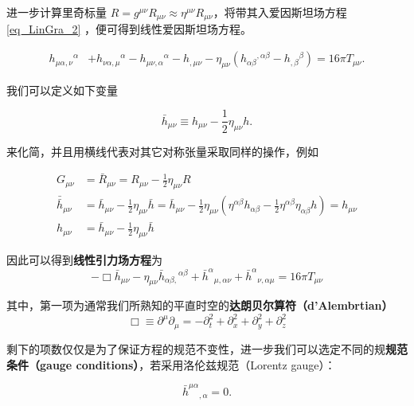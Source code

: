 进一步计算里奇标量 $R = g^{\mu\nu}R_{\mu\nu}\approx \eta^{\mu\nu}R_{\mu\nu}$，将带其入爱因斯坦场方程\autoref{eq_LinGra_2}  ，便可得到线性爱因斯坦场方程。

\begin{equation}
\begin{aligned}
h_{\mu \alpha, \nu}{ }^{\alpha} &+h_{\nu \alpha, \mu}{ }^{\alpha}-h_{\mu \nu, \alpha}{ }^{\alpha}-h_{, \mu \nu} -\eta_{\mu \nu}\left(h_{\alpha \beta}{ }^{, \alpha \beta}-h_{, \beta}{ }^{\beta}\right)= 16 \pi T_{\mu \nu} .
\end{aligned}
\end{equation}

我们可以定义如下变量

\begin{equation}
\bar{h}_{\mu\nu} \equiv h_{\mu\nu} - \frac{1}{2}\eta_{\mu\nu}h.
\end{equation}

来化简，并且用横线代表对其它对称张量采取同样的操作，例如

\begin{align}
G_{\mu\nu} &= \bar{R}_{\mu\nu} = R_{\mu\nu}- \frac{1}{2}\eta_{\mu\nu}R\\
\bar{\bar{h}}_{\mu\nu} &= \bar{h}_{\mu\nu} - \frac{1}{2}\eta_{\mu\nu}\bar{h} = \bar{h}_{\mu\nu} - \frac{1}{2}\eta_{\mu\nu} (\eta^{\alpha\beta}h_{\alpha\beta}-\frac{1}{2}\eta^{\alpha\beta}\eta_{\alpha\beta}h)= h_{\mu\nu}\\
h_{\mu\nu} &= \bar{h}_{\mu\nu} - \frac{1}{2}\eta_{\mu\nu} \bar{h}
\end{align}

因此可以得到\textbf{线性引力场方程}为
\begin{equation}
-\Box{\bar{h}_{\mu \nu}}-\eta_{\mu \nu} \bar{h}_{\alpha \beta,}{ }^{\alpha \beta} + \bar{h}^{\alpha}{ }_{\mu,\alpha\nu} + \bar{h}^{\alpha}{ }_{\nu,\alpha\mu}=16 \pi T_{\mu \nu}
\end{equation}

其中，第一项为通常我们所熟知的平直时空的\textbf{达朗贝尔算符（d'Alembrtian）}
$$
\Box \equiv  \partial^\mu\partial_\mu =  - \partial_t^2 + \partial_x^2 +\partial_y^2 + \partial_z^2
$$

剩下的项数仅仅是为了保证方程的规范不变性，进一步我们可以选定不同的规\textbf{规范条件（gauge conditions）}，若采用洛伦兹规范（Lorentz gauge）：

\begin{equation}
\bar{h}^{\mu\alpha}{ }_{,\alpha}=0.
\end{equation}

